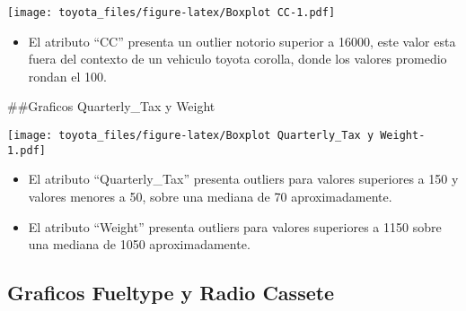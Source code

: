 \documentclass[]{article}
\newenvironment{Shaded}{\begin{snugshade}}{\end{snugshade}}
\newcommand{\DataTypeTok}[1]{\textcolor[rgb]{0.13,0.29,0.53}{#1}}
\newcommand{\DecValTok}[1]{\textcolor[rgb]{0.00,0.00,0.81}{#1}}
\newcommand{\KeywordTok}[1]{\textcolor[rgb]{0.13,0.29,0.53}{\textbf{#1}}}
\newcommand{\NormalTok}[1]{#1}
\newcommand{\OperatorTok}[1]{\textcolor[rgb]{0.81,0.36,0.00}{\textbf{#1}}}
\newcommand{\StringTok}[1]{\textcolor[rgb]{0.31,0.60,0.02}{#1}}
\providecommand{\tightlist}{%
  \setlength{\itemsep}{0pt}\setlength{\parskip}{0pt}}
\begin{document}
\texttt{[image: toyota\_files/figure-latex/Boxplot CC-1.pdf]}

\begin{itemize}
\tightlist
\item
  El atributo ``CC'' presenta un outlier notorio superior a 16000, este
  valor esta fuera del contexto de un vehiculo toyota corolla, donde los
  valores promedio rondan el 100.
\end{itemize}

\#\#Graficos Quarterly\_Tax y Weight

\begin{Shaded}
\end{Shaded}

\texttt{[image: toyota\_files/figure-latex/Boxplot Quarterly\_Tax y Weight-1.pdf]}

\begin{itemize}
\tightlist
\item
  El atributo ``Quarterly\_Tax'' presenta outliers para valores
  superiores a 150 y valores menores a 50, sobre una mediana de 70
  aproximadamente.\\
\item
  El atributo ``Weight'' presenta outliers para valores superiores a
  1150 sobre una mediana de 1050 aproximadamente.
\end{itemize}

\hypertarget{graficos-fueltype-y-radio-cassete}{%
\subsection{Graficos Fueltype y Radio
Cassete}\label{graficos-fueltype-y-radio-cassete}}

\begin{Shaded}
\end{Shaded}
\end{document}
